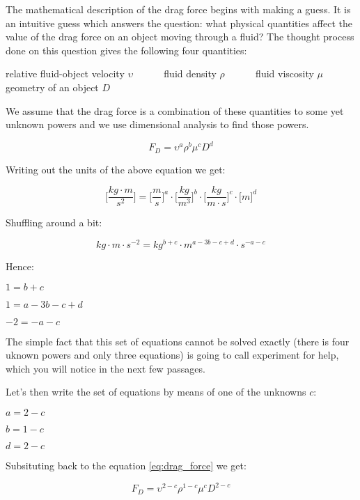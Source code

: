 The mathematical description of the drag force begins with making a guess. It is an intuitive guess which answers the question: what physical quantities affect the value of the drag force on an object moving through a fluid? The thought process done on this question gives the following four quantities:

relative fluid-object velocity $\upsilon$ \,\,\,\,\,\,\,\,\,\,\,\,\,\,\,  fluid density $\rho$ \,\,\,\,\,\,\,\,\,\,\,\,\,\,\, fluid viscosity $\mu$ \,\,\,\,\,\,\,\,\,\,\,\,\,\,\, geometry of an object $D$

We assume that the drag force is a combination of these quantities to some yet unknown powers and we use dimensional analysis to find those powers.

\begin{equation}
F_D = \upsilon^a \rho^b \mu^c D^d
\label{eq:drag_force}
\end{equation}

Writing out the units of the above equation we get:

\begin{equation*}
\Big[ \frac{kg \cdot m}{s^2} \Big] = \Big[ \frac{m}{s} \Big]^a \cdot \Big[ \frac{kg}{m^3} \Big]^b \cdot \Big[ \frac{kg}{m \cdot s} \Big]^c \cdot \Big[ m \Big]^d
\end{equation*}

Shuffling around a bit:

\begin{equation*}
kg \cdot m \cdot s^{-2} = kg^{b+c} \cdot m^{a -3b - c + d} \cdot s^{-a - c}
\end{equation*}

Hence:

$1 = b+c$

$1 = a - 3b - c + d$

$-2 = - a - c$

The simple fact that this set of equations cannot be solved exactly (there is four  uknown powers and only three equations) is going to call experiment for help, which you will notice in the next few passages.

Let's then write the set of equations by means of one of the unknowns $c$:

$a = 2 - c$

$b = 1 - c$

$d = 2 - c$

\newpage

Subsituting back to the equation \ref{eq:drag_force} we get:

\begin{equation}
F_D = \upsilon^{2 - c} \rho^{1 - c} \mu^c D^{2 - c} 
\label{eq:drag_force_powers}
\end{equation}

